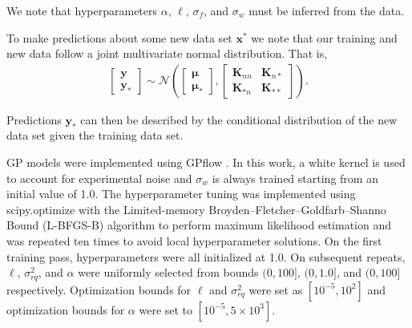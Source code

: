 \documentclass[journal=jacsat,manuscript=article]{achemso}
\newcommand{\xvec}{\ensuremath{\mathbf{x}}}
\begin{document}
We note that hyperparameters $\alpha$, $\ell$, $\sigma_{f}$, and $\sigma_{w}$ must be inferred from the data. 

To make predictions about some new data set $\xvec^*$ we note that our training and new data follow a joint multivariate normal distribution. That is,
\begin{gather*}
    \begin{bmatrix}
        \mathbf{y} \\
        \mathbf{y}_*
    \end{bmatrix}
    \sim 
    \mathcal{N}\left(
    \begin{bmatrix}
        \boldsymbol{\mu}\\
        \boldsymbol{\mu}_*
    \end{bmatrix},
    \begin{bmatrix}
        \mathbf{K}_{nn} & \mathbf{K}_{n*} \\
        \mathbf{K}_{*n} & \mathbf{K}_{**}
    \end{bmatrix} \right).
\end{gather*}

\noindent Predictions $\mathbf{y}_*$ can then be described by the conditional distribution of the new data set given the training data set.


GP models were implemented using GPflow \cite{Matthews2017GPflow:TensorFlow}. In this work, a white kernel is used to account for experimental noise and $\sigma_w$ is always trained starting from an initial value of 1.0. The hyperparameter tuning was implemented using scipy.optimize \cite{Virtanen2020SciPyPython} with the Limited-memory Broyden–Fletcher–Goldfarb–Shanno Bound (L-BFGS-B) algorithm to perform maximum likelihood estimation and was repeated ten times to avoid local hyperparameter solutions. On the first training pass, hyperparameters were all initialized at 1.0. On subsequent repeats, $\ell$, $\sigma^2_{rq}$, and $\alpha$ were uniformly selected from bounds $(0, 100]$, $(0, 1.0]$, and $(0, 100]$  respectively. Optimization bounds for $\ell$ and $\sigma^2_{rq}$ were set as $[10^{-5}, 10^2]$ and optimization bounds for $\alpha$ were set to $[10^{-5}, 5\times 10^3]$.
\end{document}

